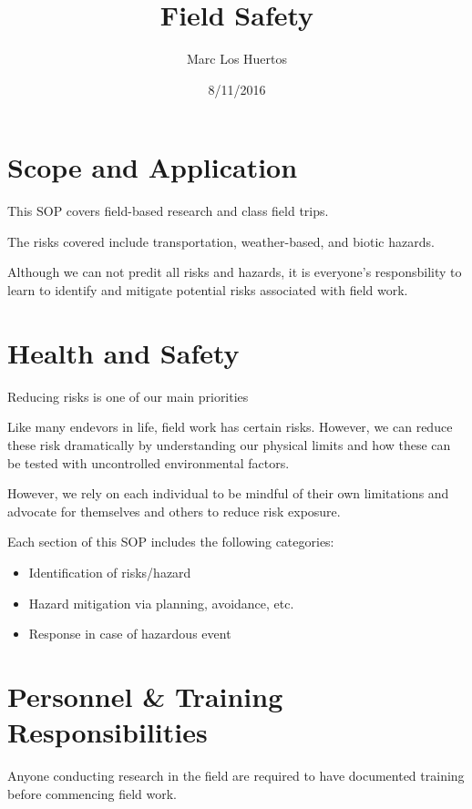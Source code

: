 \documentclass[12pt]{../SOP2}
\title{Field Safety}
\date{8/11/2016}
\author{Marc Los Huertos}
\begin{document}


\maketitle

\section{Scope and Application}

\NP This SOP covers field-based research and class field trips. 

\NP The risks covered include transportation, weather-based, and biotic hazards.

\NP Although we can not predit all risks and hazards, it is everyone's responsbility to learn to identify and mitigate potential risks associated with field work.

\section{Health and Safety}

\NP Reducing risks is one of our main priorities

\NP Like many endevors in life, field work has certain risks. However, we can reduce these risk dramatically by understanding our physical limits and how these can be tested with uncontrolled environmental factors.

\NP However, we rely on each individual to be mindful of their own limitations and advocate for themselves and others to reduce risk exposure.

\NP Each section of this SOP includes the following categories:

\begin{itemize}
  \item Identification of risks/hazard
  \item Hazard mitigation via planning, avoidance, etc.
  \item Response in case of hazardous event
\end{itemize}

\section{Personnel \& Training Responsibilities}

\NP Anyone conducting research in the field are required to have documented training before commencing field work. 
\end{document}
